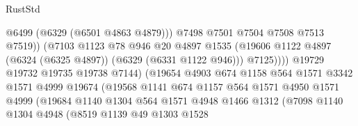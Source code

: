 \begin{lexlean}{RustStd}
\begin{coremodule}
{{                                          @6499
                                          (@6329 (@6501 @4863 @4879)))
                                        @7498
                                        @7501
                                        @7504
                                        @7508
                                        @7513
                                        @7519))
                                    (@7103
                                      @1123
                                      @78
                                      @946
                                      @20
                                      @4897
                                      @1535
                                      (@19606
                                        @1122
                                        @4897
                                        (@6324 (@6325 @4897))
                                        (@6329 (@6331 @1122 @946)))
                                      @7125))))
                              @19729
                              @19732
                              @19735
                              @19738
                              @7144)
                            (@19654
                              @4903
                              @674
                              @1158
                              @564
                              @1571
                              @3342
                              @1571
                              @4999
                              @19674
                              (@19568
                                @1141
                                @674
                                @1157
                                @564
                                @1571
                                @4950
                                @1571
                                @4999
                                (@19684
                                  @1140
                                  @1304
                                  @564
                                  @1571
                                  @4948
                                  @1466
                                  @1312
                                  (@7098
                                    @1140
                                    @1304
                                    @4948
                                    (@8519
                                      @1139
                                      @49
                                      @1303
                                      @1528
}}
\end{coremodule}
\end{lexlean}
